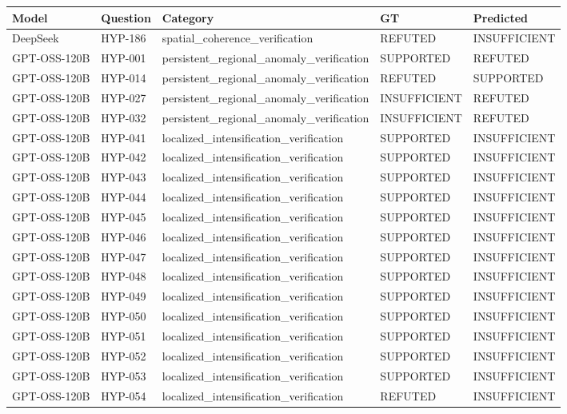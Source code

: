 \begin{tabular}{lllll}
\toprule
Model & Question & Category & GT & Predicted \\
\midrule
DeepSeek & HYP-186 & spatial_coherence_verification & REFUTED & INSUFFICIENT \\
GPT-OSS-120B & HYP-001 & persistent_regional_anomaly_verification & SUPPORTED & REFUTED \\
GPT-OSS-120B & HYP-014 & persistent_regional_anomaly_verification & REFUTED & SUPPORTED \\
GPT-OSS-120B & HYP-027 & persistent_regional_anomaly_verification & INSUFFICIENT & REFUTED \\
GPT-OSS-120B & HYP-032 & persistent_regional_anomaly_verification & INSUFFICIENT & REFUTED \\
GPT-OSS-120B & HYP-041 & localized_intensification_verification & SUPPORTED & INSUFFICIENT \\
GPT-OSS-120B & HYP-042 & localized_intensification_verification & SUPPORTED & INSUFFICIENT \\
GPT-OSS-120B & HYP-043 & localized_intensification_verification & SUPPORTED & INSUFFICIENT \\
GPT-OSS-120B & HYP-044 & localized_intensification_verification & SUPPORTED & INSUFFICIENT \\
GPT-OSS-120B & HYP-045 & localized_intensification_verification & SUPPORTED & INSUFFICIENT \\
GPT-OSS-120B & HYP-046 & localized_intensification_verification & SUPPORTED & INSUFFICIENT \\
GPT-OSS-120B & HYP-047 & localized_intensification_verification & SUPPORTED & INSUFFICIENT \\
GPT-OSS-120B & HYP-048 & localized_intensification_verification & SUPPORTED & INSUFFICIENT \\
GPT-OSS-120B & HYP-049 & localized_intensification_verification & SUPPORTED & INSUFFICIENT \\
GPT-OSS-120B & HYP-050 & localized_intensification_verification & SUPPORTED & INSUFFICIENT \\
GPT-OSS-120B & HYP-051 & localized_intensification_verification & SUPPORTED & INSUFFICIENT \\
GPT-OSS-120B & HYP-052 & localized_intensification_verification & SUPPORTED & INSUFFICIENT \\
GPT-OSS-120B & HYP-053 & localized_intensification_verification & SUPPORTED & INSUFFICIENT \\
GPT-OSS-120B & HYP-054 & localized_intensification_verification & REFUTED & INSUFFICIENT \\

\end{tabular}
